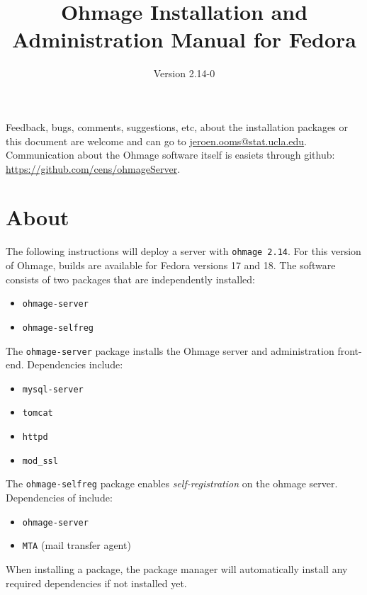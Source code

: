\documentclass{scrartcl}
\title{Ohmage Installation and Administration Manual for Fedora}
\subtitle{Version 2.14-0}
\begin{document}
\maketitle

\noindent Feedback, bugs, comments, suggestions, etc, about the installation
packages or this document are welcome and can go to \href{mailto:jeroen.ooms@stat.ucla.edu}{jeroen.ooms@stat.ucla.edu}.
Communication about the Ohmage software itself is easiets through github:
\href{https://github.com/cens/ohmageServer}{https://github.com/cens/ohmageServer}.

\section*{About}

\noindent The following instructions will deploy a server with \texttt{ohmage
2.14}. For this version of Ohmage, builds are available for Fedora versions 17 and 18.
The software consists of two packages that are independently installed:

\begin{itemize}
  \item \texttt{ohmage-server}
  \item \texttt{ohmage-selfreg} 
\end{itemize}

\noindent The \texttt{ohmage-server} package installs the Ohmage server and
administration front-end. Dependencies include:

\begin{itemize}
  \item \texttt{mysql-server}
  \item \texttt{tomcat}
  \item \texttt{httpd}
  \item \texttt{mod\_ssl}
\end{itemize}

\noindent The \texttt{ohmage-selfreg} package enables \emph{self-registration}
on the ohmage server. Dependencies of include:

\begin{itemize}
  \item \texttt{ohmage-server}
  \item \texttt{MTA} (mail transfer agent)
\end{itemize}

\noindent When installing a package, the package manager will automatically
install any required dependencies if not installed yet.
\end{document}
